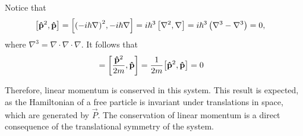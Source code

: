     Notice that
    \begin{align*}
        \left[ \mathbf{\hat{p}}^2, \mathbf{\hat{p}} \right] &= \left[ {\left( -i\hbar \nabla \right)}^2, -i\hbar \nabla \right] = i\hbar^3 \left[ \nabla^2, \nabla \right] = i\hbar^3 \left( \nabla^3 - \nabla^3 \right) = 0,
    \end{align*}
    where $\nabla^3 = \nabla\cdot\nabla\cdot\nabla$.
    It follows that
    \begin{align*}
        [\hat{H},\vh{p}]
            &= \left[\frac{\vh{p}^2}{2m},\vh{p}\right] = \frac{1}{2m}{\left[\vh{p}^2,\vh{p}\right]} = 0
    \end{align*}

    Therefore, linear momentum is conserved in this system. This result is expected, as the Hamiltonian of a free particle is invariant under translations in space, which are generated by $\vec{P}$. The conservation of linear momentum is a direct consequence of the translational symmetry of the system.

